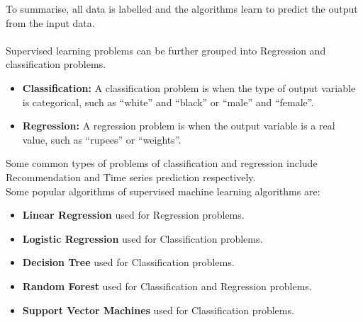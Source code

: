\documentclass[Proceedings]{ascelike}
\begin{document}

To summarise, all data is labelled and the algorithms learn to predict the output from the input data.\\
\\Supervised learning problems can be further grouped into Regression and classification problems.

\begin{itemize}
	\item \textbf{Classification:} A classification problem is when the type of output variable is categorical, such as “white” and “black” or “male” and “female”.
	\item \textbf{Regression:} A regression problem is when the output variable is a real value, such as “rupees” or “weights”.
\end{itemize}
Some common types of problems of classification and regression include Recommendation and Time series prediction respectively.
\\Some popular algorithms of supervised machine learning algorithms are:
\begin{itemize}
	\item \textbf{Linear Regression} used for Regression problems.
	\item \textbf{Logistic Regression} used for Classification problems.
	\item \textbf{Decision Tree} used for Classification problems.
	\item \textbf{Random Forest} used for Classification and Regression problems.
	\item \textbf{Support Vector Machines} used for Classification problems.
	
\end{itemize}
\end{document}
